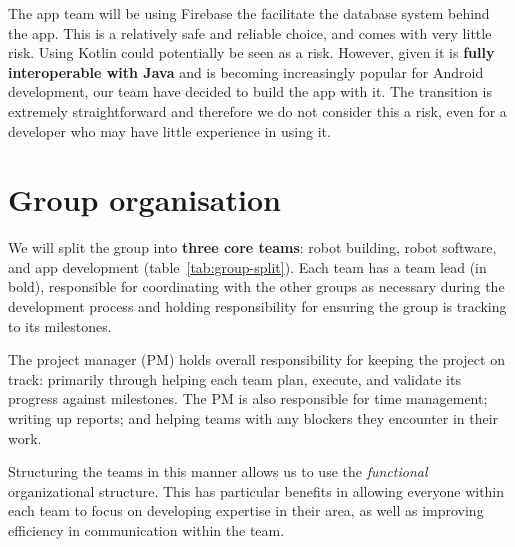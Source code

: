 \documentclass{article}
\begin{document}
The app team will be using Firebase the facilitate the database system behind the app. This is a relatively safe and reliable choice, and comes with very little risk. Using Kotlin could potentially be seen as a risk. However, given it is {\bf fully interoperable with Java} and is becoming increasingly popular for Android development, our team have decided to build the app with it. The transition is extremely straightforward and therefore we do not consider this a risk, even for a developer who may have little experience in using it.

\section{Group organisation}
\begin{table}[]
  \caption{Team splits across the group. Names in bold are key points of contact.}
  \label{tab:group-split}
\end{table}

We will split the group into {\bf three core teams}: robot building, robot software, and app development (table~\ref{tab:group-split}). Each team has a team lead (in bold), responsible for coordinating with the other groups as necessary during the development process and holding responsibility for ensuring the group is tracking to its milestones.

The project manager (PM) holds overall responsibility for keeping the project on track: primarily through helping each team plan, execute, and validate its progress against milestones. The PM is also responsible for time management; writing up reports; and helping teams with any blockers they encounter in their work.

Structuring the teams in this manner allows us to use the {\it functional} organizational structure. This has particular benefits in allowing everyone within each team to focus on developing expertise in their area, as well as improving efficiency in communication within the team.
\end{document}
